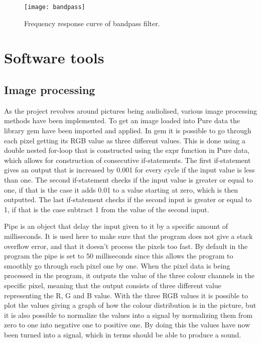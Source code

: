 \begin{figure}
\centering
\texttt{[image: bandpass]}
\caption{Frequency response curve of bandpass filter.}
\label{fig:bandpass}
\end{figure}



\section{Software tools}\label{sec:softwareTools}
	\subsection{Image processing}\label{sub:imageprocessing}
	As the project revolves around pictures being audiolised, various image processing methods have been implemented. To get an image loaded into Pure data the library gem have been imported and applied. In gem it is possible to go through each pixel getting its RGB value as three different values. This is done using a double nested for-loop that is constructed using the expr function in Pure data, which allows for construction of consecutive if-statements. The first if-statement gives an output that is increased by 0.001 for every cycle if the input value is less than one. The second if-statement checks if the input value is greater or equal to one, if that is the case it adds 0.01 to a value starting at zero, which is then outputted. The last if-statement checks if the second input is greater or equal to 1, if that is the case subtract 1 from the value of the second input.
	
	Pipe is an object that delay the input given to it by a specific amount of milliseconds. It is used here to make sure that the program does not give a stack overflow error, and that it doesn't process the pixels too fast. By default in the program the pipe is set to 50 milliseconds since this allows the program to smoothly go through each pixel one by one. 
	When the pixel data is being processed in the program, it outputs the value of the three colour channels in the specific pixel, meaning that the output consists of three different value representing the R, G and B value. With the three RGB values it is possible to plot the values giving a graph of how the colour distribution is in the picture, but it is also possible to normalize the values into a signal by normalizing them from zero to one into negative one to positive one. By doing this the values have now been turned into a signal, which in terms should be able to produce a sound.

